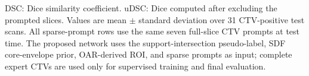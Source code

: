 \begin{table}[t]
\begin{threeparttable}
{}
\begin{tablenotes}[flushleft]\footnotesize
\item DSC: Dice similarity coefficient. uDSC: Dice computed after excluding the prompted slices. Values are mean $\pm$ standard deviation over 31 CTV-positive test scans. All sparse-prompt rows use the same seven full-slice CTV prompts at test time. The proposed network uses the support-intersection pseudo-label, SDF core-envelope prior, OAR-derived ROI, and sparse prompts as input; complete expert CTVs are used only for supervised training and final evaluation.
\end{tablenotes}
\end{threeparttable}
\end{table}
